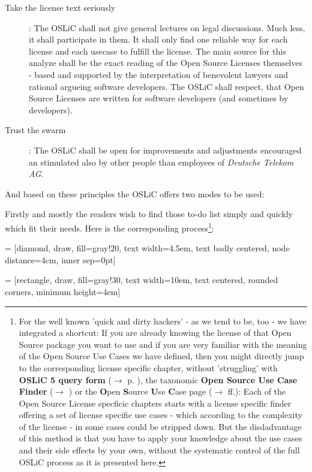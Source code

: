 \begin{description}
  \item[Take the license text seriously]: The OSLiC shall not give general
  lectures on legal discussions. Much less, it shall participate in them. It
  shall only find one reliable way for each license and each usecase to fulfill
  the license. The main source for this analyze shall be the exact reading of
  the Open Source Licenses themselves - based and supported by the
  interpretation of benevolent lawyers and rational argueing software
  developers. The OSLiC shall respect, that Open Source Licenses are written for
  software developers (and sometimes by developers).
  
  \item[Trust the swarm]: The OSLiC shall be open for improvements and
  adjustments encouraged an stimulated also by other people than employees of
  \emph{Deutsche Telekom AG}.
\end{description}

And based on these principles the OSLiC offers two modes to be used:

Firstly and mostly the readers wish to find those to-do list simply and quickly
which fit their needs. Here is the corresponding process\footnote{For the well
known 'quick and dirty hackers' - as we tend to be, too - we have integrated a
shortcut: If you are already knowing the license of that Open Source package you
want to use and if you are very familiar with the meaning of the Open Source Use
Cases we have defined, then you might directly jump to the corresponding license
specific chapter, without 'struggling' with \textbf{OSLiC 5 query form}
($\rightarrow$ p. \pageref{OSLiCStandardFormForGatheringInformation}), the
taxonomic \textbf{Open Source Use Case Finder} ($\rightarrow$
\pageref{OSLiCUseCaseFinder}) or the \textbf{O}pen \textbf{S}ource \textbf{U}se
\textbf{C}ase page ($\rightarrow$ \pageref{OSUCList}ff.): Each of the Open
Source License specficic chapters starts with a license specific finder offering
a set of license specific use cases - which according to the complexity of the
license - in some cases could be stripped down. But the disdadvantage of this
method is that you have to apply your knowledge about the use cases and their
side effects by your own, without the systematic control of the full OSLiC
process as it is presented here.
}:

 = [diamond, draw, fill=gray!20, 
    text width=4.5em, text badly centered, node distance=4cm, inner sep=0pt]

 = [rectangle, draw, fill=gray!30, 
    text width=10em, text centered, rounded corners, minimum height=4em]
 

